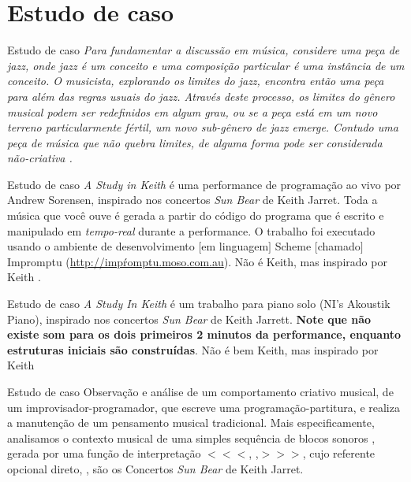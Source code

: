 \documentclass[aspectratio=169]{beamer}
\begin{document}
\section{Estudo de caso}
\begin{frame}{Estudo de caso}
\emph{Para fundamentar a discussão em música, considere uma peça de \emph{jazz}, onde \emph{jazz} é um conceito e uma composição particular é uma instância de um conceito. O musicista, explorando os limites do \emph{jazz}, encontra então uma peça para além das regras usuais do \emph{jazz}. Através deste processo, os limites do gênero musical podem ser redefinidos em algum grau, ou se a peça está em um novo terreno particularmente fértil, um novo sub-gênero de \emph{jazz} emerge. Contudo uma peça de música que não quebra limites, de alguma forma pode ser considerada não-criativa \cite[p.~117]{McLean2011}.}
\end{frame}

\begin{frame}{Estudo de caso}
\emph{A Study in Keith} é uma performance de programação ao vivo por Andrew Sorensen, inspirado nos concertos \emph{Sun Bear} de Keith Jarret. Toda a música que você ouve é gerada a partir do código do programa que é escrito e manipulado em \emph{tempo-real} durante a performance. O trabalho foi executado usando o ambiente de desenvolvimento $[$em linguagem$]$ Scheme $[$chamado$]$ Impromptu (\url{http://impŕomptu.moso.com.au}). Não é Keith, mas inspirado por Keith \cite{sorensen_youtube_2014}.
\end{frame}

\begin{frame}{Estudo de caso}
\emph{A Study In Keith} é um trabalho para piano solo (NI's Akoustik Piano), inspirado nos concertos \emph{Sun Bear} de Keith Jarrett. \textbf{Note que não existe som para os dois primeiros 2 minutos da performance, enquanto estruturas iniciais são construídas}. Não é bem Keith, mas inspirado por Keith \cite{sorensen_keith_2009}
\end{frame}

\begin{frame}{Estudo de caso}
Observação e análise de um comportamento criativo musical, de um improvisador-programador, que escreve uma programação-partitura, e realiza a manutenção de um pensamento musical tradicional. Mais especificamente, analisamos o contexto musical de uma simples sequência de blocos sonoros , gerada por uma função de interpretação $<<<$, ,$>>>$, cujo referente opcional direto, , são os Concertos \emph{Sun Bear} de Keith Jarret.
\end{frame}
\end{document}
